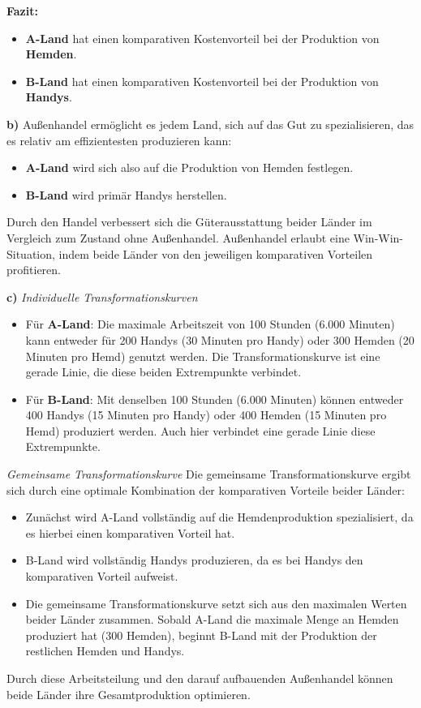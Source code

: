 {\textbf{Fazit:}
\begin{itemize}
    \item \textbf{A-Land} hat einen komparativen Kostenvorteil bei der Produktion von \textbf{Hemden}.
    \item \textbf{B-Land} hat einen komparativen Kostenvorteil bei der Produktion von \textbf{Handys}.
\end{itemize}





\textbf {b)}
Außenhandel ermöglicht es jedem Land, sich auf das Gut zu spezialisieren, das es relativ am effizientesten produzieren kann:
\begin{itemize}
    \item \textbf{A-Land} wird sich also auf die Produktion von Hemden festlegen.
    \item \textbf{B-Land} wird primär Handys herstellen.
\end{itemize}

Durch den Handel verbessert sich die Güterausstattung beider Länder im Vergleich zum Zustand ohne Außenhandel. Außenhandel erlaubt eine Win-Win-Situation, indem beide Länder von den jeweiligen komparativen Vorteilen profitieren.

\textbf{c)}
\textit{Individuelle Transformationskurven}
\begin{itemize}
    \item Für \textbf{A-Land}: Die maximale Arbeitszeit von 100 Stunden (6.000 Minuten) kann entweder für 200 Handys (30 Minuten pro Handy) oder 300 Hemden (20 Minuten pro Hemd) genutzt werden. Die Transformationskurve ist eine gerade Linie, die diese beiden Extrempunkte verbindet.
    \item Für \textbf{B-Land}: Mit denselben 100 Stunden (6.000 Minuten) können entweder 400 Handys (15 Minuten pro Handy) oder 400 Hemden (15 Minuten pro Hemd) produziert werden. Auch hier verbindet eine gerade Linie diese Extrempunkte.
\end{itemize}

\textit{Gemeinsame Transformationskurve}
Die gemeinsame Transformationskurve ergibt sich durch eine optimale Kombination der komparativen Vorteile beider Länder:
\begin{itemize}
    \item Zunächst wird A-Land vollständig auf die Hemdenproduktion spezialisiert, da es hierbei einen komparativen Vorteil hat.
    \item B-Land wird vollständig Handys produzieren, da es bei Handys den komparativen Vorteil aufweist.
    \item Die gemeinsame Transformationskurve setzt sich aus den maximalen Werten beider Länder zusammen. Sobald A-Land die maximale Menge an Hemden produziert hat (300 Hemden), beginnt B-Land mit der Produktion der restlichen Hemden und Handys.
\end{itemize}

Durch diese Arbeitsteilung und den darauf aufbauenden Außenhandel können beide Länder ihre Gesamtproduktion optimieren.

}




